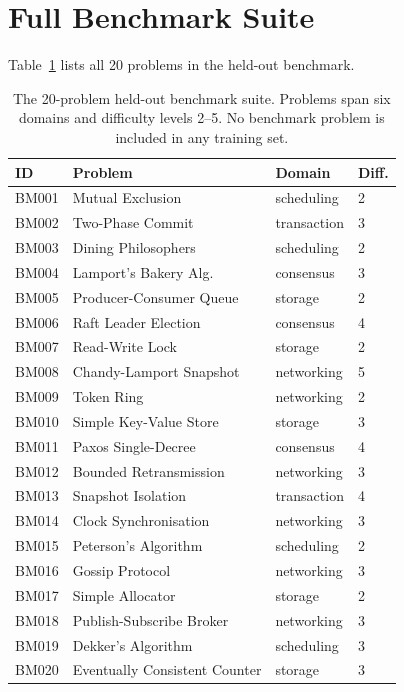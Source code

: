 \documentclass[11pt]{article}
\begin{document}
\section{Full Benchmark Suite}
\label{sec:app-benchmark}

Table~\ref{tab:benchmark-suite} lists all 20 problems in the held-out
benchmark.

\begin{table}[h]
\centering
\small
\setlength{\tabcolsep}{4pt}
\begin{tabular}{@{}llll@{}}
\toprule
ID & Problem & Domain & Diff. \\
\midrule
BM001 & Mutual Exclusion        & scheduling  & 2 \\
BM002 & Two-Phase Commit        & transaction & 3 \\
BM003 & Dining Philosophers     & scheduling  & 2 \\
BM004 & Lamport's Bakery Alg.   & consensus   & 3 \\
BM005 & Producer-Consumer Queue & storage     & 2 \\
BM006 & Raft Leader Election    & consensus   & 4 \\
BM007 & Read-Write Lock         & storage     & 2 \\
BM008 & Chandy-Lamport Snapshot & networking  & 5 \\
BM009 & Token Ring              & networking  & 2 \\
BM010 & Simple Key-Value Store  & storage     & 3 \\
BM011 & Paxos Single-Decree     & consensus   & 4 \\
BM012 & Bounded Retransmission  & networking  & 3 \\
BM013 & Snapshot Isolation      & transaction & 4 \\
BM014 & Clock Synchronisation   & networking  & 3 \\
BM015 & Peterson's Algorithm    & scheduling  & 2 \\
BM016 & Gossip Protocol         & networking  & 3 \\
BM017 & Simple Allocator        & storage     & 2 \\
BM018 & Publish-Subscribe Broker& networking  & 3 \\
BM019 & Dekker's Algorithm      & scheduling  & 3 \\
BM020 & Eventually Consistent Counter & storage & 3 \\
\bottomrule
\end{tabular}
\caption{The 20-problem held-out benchmark suite.  Problems span six
domains and difficulty levels 2--5.  No benchmark problem is included
in any training set.}
\label{tab:benchmark-suite}
\end{table}
\end{document}
